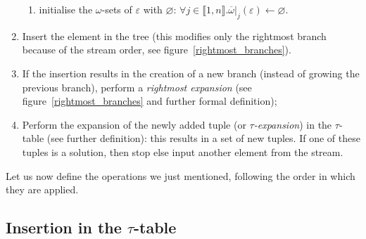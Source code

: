 \begin{enumerate}
\begin{enumerate}
    \item \label{algo:attr_insertion:3} initialise the \(\omega\)-sets
      of \(\varepsilon\) with \(\varnothing\): \(\forall j \in \llbracket 1, n
      \rrbracket.\overline{\omega}|_j(\varepsilon) \leftarrow \varnothing\).
  
  \end{enumerate}

  \item \label{algo:tree_insertion} Insert the element in the \XML
    tree (this modifies only the rightmost branch because of the
    stream order, see figure~\ref{rightmost_branches}).

  \item \label{algo:border_expansion} If the insertion results in the
    creation of a new branch (instead of growing the previous branch),
    perform a \emph{rightmost expansion} (see
    figure~\ref{rightmost_branches} and further formal definition);

  \item \label{algo:tau_expansion} Perform the expansion of the
    newly added tuple (or \emph{\(\tau\)-expansion}) in the
    \(\tau\)-table (see further definition): this results in a set of
    new tuples. If one of these tuples is a solution, then stop else
    input another element from the stream.

\end{enumerate}

Let us now define the operations we just mentioned, following the
order in which they are applied.


\subsection{Insertion in the \(\tau\)-table}
\label{tau_insertion}

